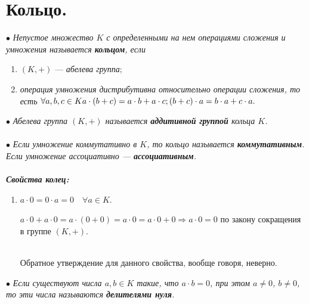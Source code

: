 \section{Кольцо.}
$\bullet$ \textit{Непустое множество $K$ с определенными на нем операциями сложения и умножения называется \textbf{кольцом}, если} \begin{enumerate}
	\item $(K, +)$ --- \textit{абелева группа};
	\item \textit{операция умножения дистрибутивна относительно операции сложения, то есть} $\forall a,b,c \in K\\
	a\cdot (b+c) = a\cdot b + a\cdot c;\\
	(b+c)\cdot a = b\cdot a + c\cdot a.$
\end{enumerate}
$\bullet$ \textit{Абелева группа $(K,+)$ называется \textbf{аддитивной группой} кольца $K$.}\\\\
$\bullet$ \textit{Если умножение коммутативно в $K$, то кольцо называется \textbf{коммутативным}. Если умножение ассоциативно --- \textbf{ассоциативным}.}\\\\
\textit{\textbf{Свойства колец:}}\begin{enumerate}
	\item $a\cdot 0 = 0\cdot a = 0\quad \forall a \in K$.
	\begin{Proof}
		$a\cdot 0 + a\cdot 0 = a\cdot (0+0) = a\cdot 0 = a\cdot 0 + 0 \Rightarrow a\cdot 0 = 0$ по закону сокращения в группе $(K, +)$.
	\end{Proof}\\
	Обратное утверждение для данного свойства, вообще говоря, неверно.
\end{enumerate}
$\bullet$ \textit{Если существуют числа $a,b\in K$ такие, что $a\cdot b = 0$, при этом $a\ne 0$, $b\ne 0$, то эти числа называются \textbf{делителями нуля}.}
